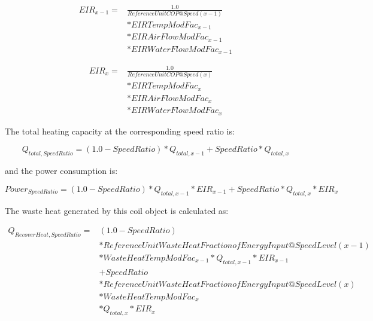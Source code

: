 \begin{equation}
  \begin{array}{rl}
    EIR_{x - 1} =& \frac{1.0}{ReferenceUnitCOP@Speed(x - 1)} \\
                &* EIRTempModFac_{x - 1} \\
                &* EIRAirFlowModFac_{x - 1} \\
                &* EIRWaterFlowModFac_{x - 1}
  \end{array}
\end{equation}

\begin{equation}
  \begin{array}{rl}
    EIR_x =& \frac{1.0}{ReferenceUnitCOP@Speed(x)} \\
                &* EIRTempModFac_{x} \\
                &* EIRAirFlowModFac_{x} \\
                &* EIRWaterFlowModFac_{x}
  \end{array}
\end{equation}

The total heating capacity at the corresponding speed ratio is:

\begin{equation}
{Q_{total,SpeedRatio}} = \left( {1.0 - SpeedRatio} \right)*{Q_{total,x - 1}} + SpeedRatio*{Q_{total,x}}
\end{equation}

and the power consumption is:

\begin{equation}
Powe{r_{SpeedRatio}} = \left( {1.0 - SpeedRatio} \right)*{Q_{total,x - 1}}*EI{R_{x - 1}} + SpeedRatio*{Q_{total,x}}*EI{R_x}
\end{equation}

The waste heat generated by this coil object is calculated as:

\begin{equation}
  \begin{array}{rl}
    Q_{RecoverHeat,SpeedRatio} =& \left( 1.0 - SpeedRatio \right) \\
                               &* ReferenceUnitWasteHeatFractionofEnergyInput@SpeedLevel\left( {x - 1} \right) \\
                               &* WasteHeatTempModFac_{x - 1} * Q_{total,x - 1} * EIR_{x - 1} \\
                               &+ SpeedRatio \\
                               &* ReferenceUnitWasteHeatFractionofEnergyInput@SpeedLevel\left( x \right) \\
                               &* WasteHeatTempModFac_x \\
                               &* Q_{total,x} * EIR_x
  \end{array}
\end{equation}

